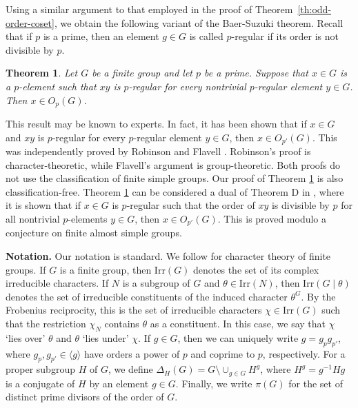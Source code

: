 \documentclass[twoside,a4paper,reqno,11pt]{amsart}
\newcommand{\<}{\langle}
\renewcommand{\>}{\rangle}
\newcommand{\la}{\langle}
\newcommand{\ra}{\rangle}
\newcommand{\Irr}{\mathrm {Irr}}
\renewcommand{\:}{\colon}
\newtheorem{theorem}{Theorem}
\theoremstyle{definition}
\begin{document}
Using a similar argument to that employed in the proof of Theorem~\ref{th:odd-order-coset}, we obtain the following variant of the Baer-Suzuki theorem. Recall that if $p$ is a prime, then an element  $g\in G$ is called $p$-regular if its order is not divisible by $p.$

\begin{theorem}
    \label{cor2}
Let $G$ be a finite group and let $p$ be a prime. Suppose that  $x\in G$ is a $p$-element such that $xy$ is $p$-regular for every nontrivial $p$-regular element $y\in G$. Then $x\in O_p(G)$.
\end{theorem}


This result may be known to experts. In fact, it has been shown that if $x\in G$ and $xy$ is $p$-regular for every $p$-regular element $y\in G$, then $x\in O_{p'}(G)$. This was independently proved by Robinson \cite{Robinson} and Flavell \cite{Flavell}. Robinson's proof is character-theoretic, while Flavell's argument is  group-theoretic. Both proofs do not use the classification of finite simple groups. Our proof of Theorem \ref{cor2} is also classification-free. Theorem \ref{cor2} can be considered a dual of Theorem D in \cite{BLM}, where it is shown that if $x\in G$ is  $p$-regular such that the order of $xy$ is divisible by $p$ for all nontrivial $p$-elements $y\in G$, then $x\in O_{p'}(G)$.  This is proved modulo a conjecture on finite almost simple groups.

\medskip
\noindent
\textbf{Notation.} Our notation is standard. We follow \cite{Isaacsbook} for character theory of finite groups. If $G$ is a finite group, then $\Irr(G)$ denotes the set of its complex irreducible characters. If $N$ is a subgroup of $G$ and $\theta\in \Irr(N)$, then $\Irr(G\mid\theta)$  denotes the set of  irreducible constituents of the induced character $\theta^G$. By the Frobenius reciprocity, this is the set of  irreducible characters $\chi\in\Irr(G)$ such that the restriction $\chi_N$ contains $\theta$ as a  constituent. In this case, we say that $\chi$ `lies over' $\theta$ and $\theta$ `lies under' $\chi$. If $g\in G$, then we can uniquely write $g=g_pg_{p'}$, where $g_p,g_{p'}\in \la g\ra$ have orders a power of $p$ and coprime to  $p$, respectively. For a proper subgroup $H$ of $G$, we define $\Delta_H(G)=G \setminus \cup_{g\in G}H^g$, where $H^g=g^{-1}Hg$ is a conjugate of $H$ by an element $g\in G$.  Finally, we write $\pi(G)$ for the set of distinct prime divisors of the order of $G$.
\end{document}
